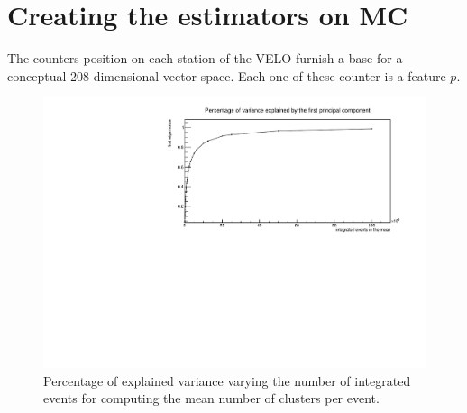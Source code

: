 \section{Creating the estimators on MC}

The counters position on each station of the VELO furnish a base for a conceptual 208-dimensional vector space. Each one of these counter is a feature $p$. 


\begin{figure}
    \centering
    \includegraphics[width=\textwidth]{figures/explained_variance_new_y.pdf}
    \caption{Percentage of explained variance varying the number of integrated events for computing the mean number of clusters per event.}
    \label{fig:explained_variance}
\end{figure}


